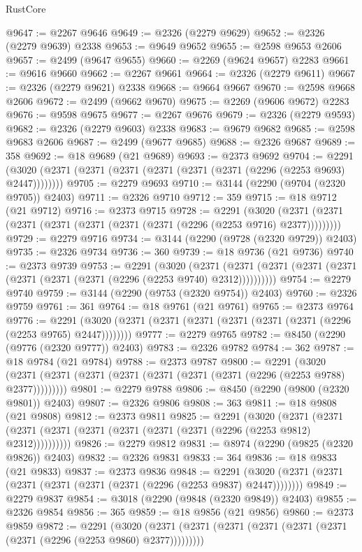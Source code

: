 \begin{lexlean}{RustCore}
\begin{coremodule}
@9647 := @2267 @9646
@9649 := @2326 (@2279 @9629)
@9652 := @2326 (@2279 @9639) @2338
@9653 := @9649 @9652
@9655 := @2598 @9653 @2606
@9657 := @2499 (@9647 @9655)
@9660 := @2269 (@9624 @9657) @2283
@9661 := @9616 @9660
@9662 := @2267 @9661
@9664 := @2326 (@2279 @9611)
@9667 := @2326 (@2279 @9621) @2338
@9668 := @9664 @9667
@9670 := @2598 @9668 @2606
@9672 := @2499 (@9662 @9670)
@9675 := @2269 (@9606 @9672) @2283
@9676 := @9598 @9675
@9677 := @2267 @9676
@9679 := @2326 (@2279 @9593)
@9682 := @2326 (@2279 @9603) @2338
@9683 := @9679 @9682
@9685 := @2598 @9683 @2606
@9687 := @2499 (@9677 @9685)
@9688 := @2326 @9687
@9689 := 358
@9692 := @18 @9689 (@21 @9689)
@9693 := @2373 @9692
@9704 := @2291 (@3020 (@2371 (@2371 (@2371 (@2371 (@2371 (@2371 (@2296 (@2253 @9693) @2447))))))))
@9705 := @2279 @9693
@9710 := @3144 (@2290 (@9704 (@2320 @9705)) @2403)
@9711 := @2326 @9710
@9712 := 359
@9715 := @18 @9712 (@21 @9712)
@9716 := @2373 @9715
@9728 := @2291
    (@3020 (@2371 (@2371 (@2371 (@2371 (@2371 (@2371 (@2371 (@2296 (@2253 @9716) @2377)))))))))
@9729 := @2279 @9716
@9734 := @3144 (@2290 (@9728 (@2320 @9729)) @2403)
@9735 := @2326 @9734
@9736 := 360
@9739 := @18 @9736 (@21 @9736)
@9740 := @2373 @9739
@9753 := @2291
    (@3020
      (@2371 (@2371 (@2371 (@2371 (@2371 (@2371 (@2371 (@2371 (@2296 (@2253 @9740) @2312))))))))))
@9754 := @2279 @9740
@9759 := @3144 (@2290 (@9753 (@2320 @9754)) @2403)
@9760 := @2326 @9759
@9761 := 361
@9764 := @18 @9761 (@21 @9761)
@9765 := @2373 @9764
@9776 := @2291 (@3020 (@2371 (@2371 (@2371 (@2371 (@2371 (@2371 (@2296 (@2253 @9765) @2447))))))))
@9777 := @2279 @9765
@9782 := @8450 (@2290 (@9776 (@2320 @9777)) @2403)
@9783 := @2326 @9782
@9784 := 362
@9787 := @18 @9784 (@21 @9784)
@9788 := @2373 @9787
@9800 := @2291
    (@3020 (@2371 (@2371 (@2371 (@2371 (@2371 (@2371 (@2371 (@2296 (@2253 @9788) @2377)))))))))
@9801 := @2279 @9788
@9806 := @8450 (@2290 (@9800 (@2320 @9801)) @2403)
@9807 := @2326 @9806
@9808 := 363
@9811 := @18 @9808 (@21 @9808)
@9812 := @2373 @9811
@9825 := @2291
    (@3020
      (@2371 (@2371 (@2371 (@2371 (@2371 (@2371 (@2371 (@2371 (@2296 (@2253 @9812) @2312))))))))))
@9826 := @2279 @9812
@9831 := @8974 (@2290 (@9825 (@2320 @9826)) @2403)
@9832 := @2326 @9831
@9833 := 364
@9836 := @18 @9833 (@21 @9833)
@9837 := @2373 @9836
@9848 := @2291 (@3020 (@2371 (@2371 (@2371 (@2371 (@2371 (@2371 (@2296 (@2253 @9837) @2447))))))))
@9849 := @2279 @9837
@9854 := @3018 (@2290 (@9848 (@2320 @9849)) @2403)
@9855 := @2326 @9854
@9856 := 365
@9859 := @18 @9856 (@21 @9856)
@9860 := @2373 @9859
@9872 := @2291
    (@3020 (@2371 (@2371 (@2371 (@2371 (@2371 (@2371 (@2371 (@2296 (@2253 @9860) @2377)))))))))

\end{coremodule}
\end{lexlean}
